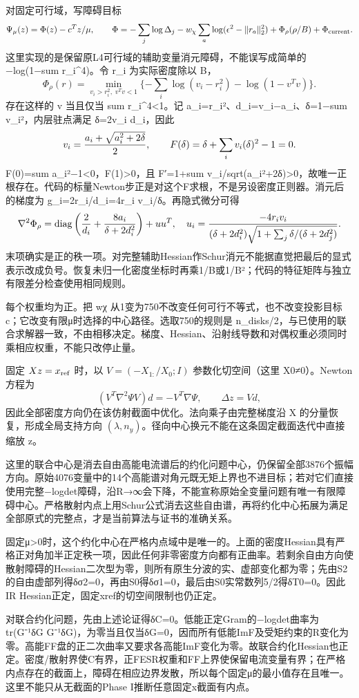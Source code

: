 \documentclass[
  10pt,
  a4paper,
]{article}
\begin{document}
对固定可行域，写障碍目标 \[
\Psi_\mu(z)=\Phi(z)-c^Tz/\mu,\qquad
\Phi=-\sum_j\log\Delta_j-w_\chi\sum_a\log(\epsilon^2-\|r_a\|_2^2)+\Phi_\rho(\rho/B)+\Phi_{\rm current}.
\] 这里实现的是保留原L4可行域的辅助变量消元障碍，不能误写成简单的
−log(1−sum r\_i\^{}4)。令 r\_i 为实际密度除以 B， \[
\Phi_\rho(r)=\min_{v_i>r_i^2,\;v^Tv<1}
\{-\sum_i\log(v_i-r_i^2)-\log(1-v^Tv)\}.
\] 存在这样的 v 当且仅当 sum r\_i\^{}4\textless1。记
a\_i=r\_i²、d\_i=v\_i−a\_i、δ=1−sum v\_i²，内层驻点满足 δ=2v\_i
d\_i，因此 \[
v_i={a_i+\sqrt{a_i^2+2\delta}\over2},\qquad
F(\delta)=\delta+\sum_i v_i(\delta)^2-1=0.
\] F(0)=sum a\_i²−1\textless0，F(1)\textgreater0，且 F′=1+sum
v\_i/sqrt(a\_i²+2δ)\textgreater0，故唯一正根存在。代码的标量Newton步正是对这个F求根，不是另设密度正则器。消元后的梯度为
g\_i=2r\_i/d\_i=4r\_i v\_i/δ。再隐式微分可得 \[
\nabla^2\Phi_\rho=\operatorname{diag}
\left({2\over d_i}+{8a_i\over\delta+2d_i^2}\right)+uu^T,
\quad
u_i={-4r_i v_i\over(\delta+2d_i^2)\sqrt{1+\sum_j\delta/(\delta+2d_j^2)}}.
\]
末项确实是正的秩一项。对完整辅助Hessian作Schur消元不能据直觉把最后的显式表示改成负号。恢复未归一化密度坐标时再乘1/B或1/B²；代码的特征矩阵与独立有限差分检查使用相同规则。

每个权重均为正。把 wχ 从1变为750不改变任何可行不等式，也不改变投影目标
c；它改变有限μ时选择的中心路径。选取750的规则是
n\_disks/2，与已使用的联合求解器一致，不由相移决定。梯度、Hessian、沿射线导数和对偶权重必须同时乘相应权重，不能只改停止量。

固定 \(Xz=x_{\rm ref}\) 时，以 \(V=(-X_{1:}/X_0;I)\) 参数化切空间（这里
X0≠0）。Newton 方程为 \[
(V^T\nabla^2\Psi V)d=-V^T\nabla\Psi,
\qquad \Delta z=Vd,
\] 因此全部密度方向仍在该仿射截面中优化。法向乘子由完整梯度沿 X
的分量恢复，形成全局支持方向
\((\lambda,n_y)\)。径向中心换元不能在这条固定截面迭代中直接缩放 z。

这里的联合中心是消去自由高能电流谱后的约化问题中心，仍保留全部3876个振幅方向。原始4076变量中的14个高能谱对角元既无矩上界也不进目标；若对它们直接使用完整−logdet障碍，沿R→∞会下降，不能宣称原始全变量问题有唯一有限障碍中心。严格散射内点上用Schur公式消去这些自由谱，再将约化中心拓展为满足全部原式的完整点，才是当前算法与证书的准确关系。

固定μ\textgreater0时，这个约化中心在严格内点域中是唯一的。上面的密度Hessian具有严格正对角加半正定秩一项，因此任何非零密度方向都有正曲率。若剩余自由方向使散射障碍的Hessian二次型为零，则所有原生分波的实、虚部变化都为零；先由S2的自由虚部列得δσ2=0，再由S0得δσ1=0，最后由S0实常数列5/2得δT0=0。因此IR
Hessian正定，固定xref的切空间限制也仍正定。

对联合约化问题，先由上述论证得δC=0。低能正定Gram的−logdet曲率为 tr(G⁻¹δG
G⁻¹δG)，为零当且仅当δG=0，因而所有低能ImF及受矩约束的R变化为零。高能FF盘的正二次曲率又要求各高能ImF变化为零。故联合约化Hessian也正定。密度/散射界使C有界，正FESR权重和FF上界使保留电流变量有界；在严格内点存在的截面上，障碍在相应边界发散，所以每个固定μ的最小值存在且唯一。这里不能只从无截面的Phase
I推断任意固定x截面有内点。
\end{document}
